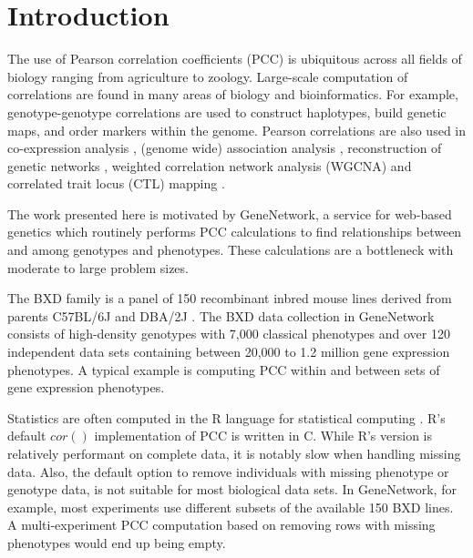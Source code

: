 \documentclass{bioinfo}
\begin{document}
\maketitle


\section{Introduction}

The use of Pearson correlation coefficients (PCC) is ubiquitous across all
fields of biology ranging from agriculture to zoology. Large-scale
computation of correlations are found in many areas of biology and
bioinformatics.  For example, genotype-genotype correlations are
used to construct haplotypes, build genetic maps, and order markers
within the genome. Pearson correlations are also used in
co-expression analysis \citep{Tesson:2010}, (genome wide)
association analysis \citep{Cichonska:2016}, reconstruction of genetic
networks \citep{Fukushima:2013}, weighted correlation network analysis
(WGCNA) \citep{Horvath:2008} and correlated trait locus (CTL)
mapping \citep{Arends2016a}.

\enlargethispage{12pt}

The work presented here is motivated by GeneNetwork, a service for
web-based genetics \citep{Sloan2016} which routinely performs PCC
calculations to find relationships between and among genotypes and
phenotypes. These calculations are a bottleneck with
moderate to large problem sizes.

The BXD family is a panel of 150 recombinant inbred mouse lines
derived from parents C57BL/6J and DBA/2J \citep{Ashbrook:2019}. The
BXD data collection in GeneNetwork consists of high-density genotypes
with 7,000 classical phenotypes and over 120 independent data sets
containing between 20,000 to 1.2 million gene expression phenotypes. A
typical example is computing PCC within and between sets of gene
expression phenotypes.

Statistics are often computed in the R language for statistical computing
\citep{R:2005}. R's default $cor()$ implementation of PCC is written in C.
While R's version is relatively performant on complete data, it is
notably slow when handling missing data. Also, the default option to
remove individuals with missing phenotype or genotype data, is not
suitable for most biological data sets. In GeneNetwork, for example,
most experiments use different subsets of the available 150 BXD
lines. A multi-experiment PCC computation based on removing rows with
missing phenotypes would end up being empty.
\end{document}
